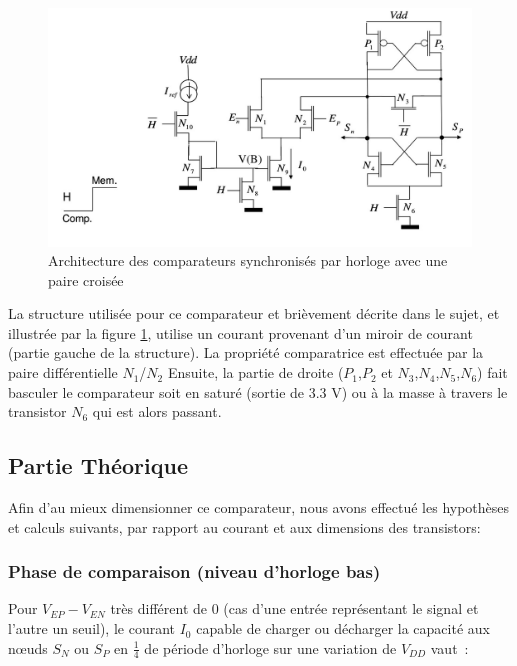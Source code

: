 \documentclass[11pt]{article}
\begin{document}
\begin{figure}[!htb]
\begin{center}
  \includegraphics[scale=0.38]{comparateur_schema.jpg}
  \caption{Architecture des comparateurs synchronis\'es par horloge avec une paire crois\'ee}
  \label{fig:figArchComp}
\end{center}
\end{figure}

La structure utilis\'ee pour ce comparateur et bri\`evement d\'ecrite dans le sujet, et illustr\'ee par
la figure \ref{fig:figArchComp}, utilise un courant provenant d'un miroir de courant (partie gauche de la structure).
La propri\'et\'e comparatrice est effectu\'ee par la paire diff\'erentielle $N_1$/$N_2$ Ensuite, la partie de droite
($P_1$,$P_2$ et $N_3$,$N_4$,$N_5$,$N_6$) fait basculer le comparateur soit en satur\'e (sortie de 3.3 V)
ou \`a la masse \`a travers le transistor $N_6$ qui est alors passant.

\subsection{Partie Th\'eorique}
Afin d'au mieux dimensionner ce comparateur, nous avons effectu\'e les hypoth\`eses et calculs suivants,
par rapport au courant et aux dimensions des transistors:

\subsubsection{Phase de comparaison (niveau d'horloge bas)}

Pour $V_{EP}-V_{EN}$ tr\`es diff\'erent de $0$ (cas d'une entr\'ee repr\'esentant le signal et l'autre un seuil),
le courant $I_0$ capable de charger ou d\'echarger la capacit\'e aux nœuds $S_N$ ou $S_P$ en $\frac{1}{4}$ de
p\'eriode d'horloge sur une variation de $V_{DD}$ vaut :
\end{document}
